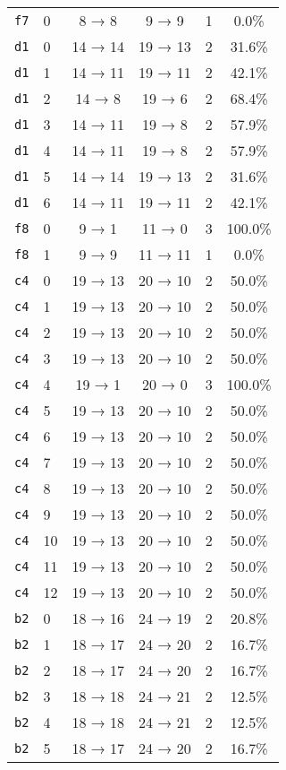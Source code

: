 \begin{tabular}{llcccc}
\texttt{f7} & 0 & 8 → 8 & 9 → 9 & 1 & 0.0\% \\
\texttt{d1} & 0 & 14 → 14 & 19 → 13 & 2 & 31.6\% \\
\texttt{d1} & 1 & 14 → 11 & 19 → 11 & 2 & 42.1\% \\
\texttt{d1} & 2 & 14 → 8 & 19 → 6 & 2 & 68.4\% \\
\texttt{d1} & 3 & 14 → 11 & 19 → 8 & 2 & 57.9\% \\
\texttt{d1} & 4 & 14 → 11 & 19 → 8 & 2 & 57.9\% \\
\texttt{d1} & 5 & 14 → 14 & 19 → 13 & 2 & 31.6\% \\
\texttt{d1} & 6 & 14 → 11 & 19 → 11 & 2 & 42.1\% \\
\texttt{f8} & 0 & 9 → 1 & 11 → 0 & 3 & 100.0\% \\
\texttt{f8} & 1 & 9 → 9 & 11 → 11 & 1 & 0.0\% \\
\texttt{c4} & 0 & 19 → 13 & 20 → 10 & 2 & 50.0\% \\
\texttt{c4} & 1 & 19 → 13 & 20 → 10 & 2 & 50.0\% \\
\texttt{c4} & 2 & 19 → 13 & 20 → 10 & 2 & 50.0\% \\
\texttt{c4} & 3 & 19 → 13 & 20 → 10 & 2 & 50.0\% \\
\texttt{c4} & 4 & 19 → 1 & 20 → 0 & 3 & 100.0\% \\
\texttt{c4} & 5 & 19 → 13 & 20 → 10 & 2 & 50.0\% \\
\texttt{c4} & 6 & 19 → 13 & 20 → 10 & 2 & 50.0\% \\
\texttt{c4} & 7 & 19 → 13 & 20 → 10 & 2 & 50.0\% \\
\texttt{c4} & 8 & 19 → 13 & 20 → 10 & 2 & 50.0\% \\
\texttt{c4} & 9 & 19 → 13 & 20 → 10 & 2 & 50.0\% \\
\texttt{c4} & 10 & 19 → 13 & 20 → 10 & 2 & 50.0\% \\
\texttt{c4} & 11 & 19 → 13 & 20 → 10 & 2 & 50.0\% \\
\texttt{c4} & 12 & 19 → 13 & 20 → 10 & 2 & 50.0\% \\
\texttt{b2} & 0 & 18 → 16 & 24 → 19 & 2 & 20.8\% \\
\texttt{b2} & 1 & 18 → 17 & 24 → 20 & 2 & 16.7\% \\
\texttt{b2} & 2 & 18 → 17 & 24 → 20 & 2 & 16.7\% \\
\texttt{b2} & 3 & 18 → 18 & 24 → 21 & 2 & 12.5\% \\
\texttt{b2} & 4 & 18 → 18 & 24 → 21 & 2 & 12.5\% \\
\texttt{b2} & 5 & 18 → 17 & 24 → 20 & 2 & 16.7\% \\

\end{tabular}
